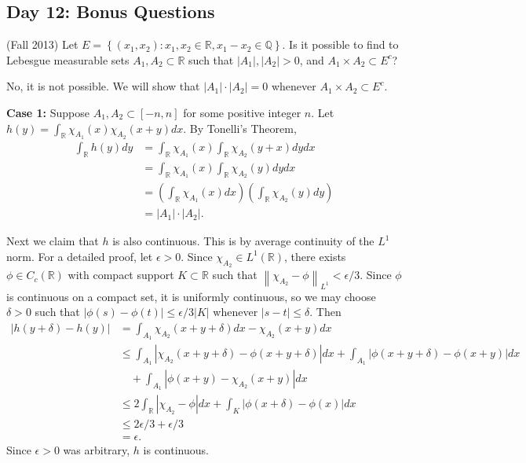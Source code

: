 \documentclass[answers]{exam}
\theoremstyle{problemstyle}
\newcommand{\norm}[1]{\left\lVert#1\right\rVert} %
\newcommand{\1}[1]{\textbf{1}_{\left[#1\right]}} %
\def\R{\mathbb{R}} %
\def\Q{\mathbb{Q}} %
\begin{document}
\begin{questions}
\newpage
\section{Day 12: Bonus Questions}

\question (Fall 2013) Let $E= \left\{ (x_{1},x_{2}) : x_{1},x_{2}\in \R, x_{1}-x_{2}\in \Q\right\}$. Is it possible to find to Lebesgue measurable sets $A_{1},A_{2}\subset\R$ such that $|A_{1}|,|A_{2}|>0$, and $A_{1}\times A_{2}\subset E^{c}$?
\begin{solution}
  No, it is not possible. We will show that $|A_{1}|\cdot|A_{2}| = 0$ whenever $A_{1}\times A_{2}\subset E^{c}$. 

 \textbf{ Case 1:} Suppose $A_{1},A_{2}\subset [-n,n]$ for some positive integer $n$.
  Let $h(y)= \int_{\R}\chi_{A_{1}}(x)\chi_{A_{2}}(x+y)dx$. By Tonelli's Theorem,
  \begin{align*}
    \int_{\R}h(y)dy
    &=\int_{\R} \chi_{A_{1}}(x) \int_{\R} \chi_{A_{2}}(y+x)dy dx\\
    &=\int_{\R} \chi_{A_{1}}(x) \int_{\R} \chi_{A_{2}}(y)dy dx\\
    &=\left(\int_{\R} \chi_{A_{1}}(x)dx\right)\left( \int_{\R} \chi_{A_{2}}(y)dy\right)\\
    &=|A_{1}|\cdot |A_{2}|.
  \end{align*}

  Next we claim that $h$ is also continuous. This is by average continuity of the $L^{1}$ norm. For a detailed proof, let $\epsilon>0$. Since $\chi_{A_{2}}\in L^{1}(\R)$, there exists $\phi\in C_{c}(\R)$ with compact support $K\subset \R$ such that $\norm{\chi_{A_{2}}-\phi}_{L^{1}}<\epsilon/3$. Since $\phi$ is continuous on a compact set, it is uniformly continuous, so we may choose $\delta>0$ such that $|\phi(s)-\phi(t)|\leq\epsilon/3|K|$ whenever $|s-t|\leq\delta$. Then
  \begin{align*}
    |h(y+\delta)-h(y)|
    &= \int_{A_{1}}\chi_{A_{2}}(x+y+\delta)dx - \chi_{A_{2}}(x+y)dx\\
    &\leq \int_{A_{1}}|\chi_{A_{2}}(x+y+\delta) -\phi(x+y+\delta)|dx +\int_{A_{1}}|\phi(x+y+\delta)-\phi(x+y)|dx\\
    &\quad+\int_{A_{1}}|\phi(x+y) - \chi_{A_{2}}(x+y)|dx\\
    &\leq 2\int_{\R}|\chi_{A_{2}} -\phi|dx +\int_{K}|\phi(x+\delta)-\phi(x)|dx\\
    &\leq 2\epsilon/3 + \epsilon/3\\
    &= \epsilon.
  \end{align*}
  Since $\epsilon>0$ was arbitrary, $h$ is continuous.


\end{solution}
\end{questions}
\end{document}
